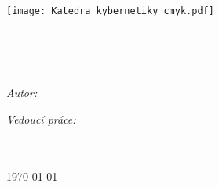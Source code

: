 \frontmatter %

\pagestyle{plain} %


\begin{titlepage}
\begin{center}
\texttt{[image: Katedra kybernetiky\_cmyk.pdf]} %
\\\vspace{3cm}
\textsc{\Large \ttype}\\[0.2cm] 	 %

\HRule \\[0.4cm] %
{\huge \bfseries \ttitle\par}\vspace{0.4cm} %
\HRule \\[1.5cm] %
 
\begin{minipage}[t]{0.45\textwidth}
\begin{flushleft} \large
\emph{Autor:}\\
{\authorname}
\end{flushleft}
\end{minipage}
\begin{minipage}[t]{0.45\textwidth}
\begin{flushright} \large
\emph{Vedoucí práce:} \\
{\supname}
\end{flushright}
\end{minipage}\\[2.5cm]
 
 ~\\\vspace{2cm}
{\large \today} %
 
\vfill
\end{center}
\end{titlepage}